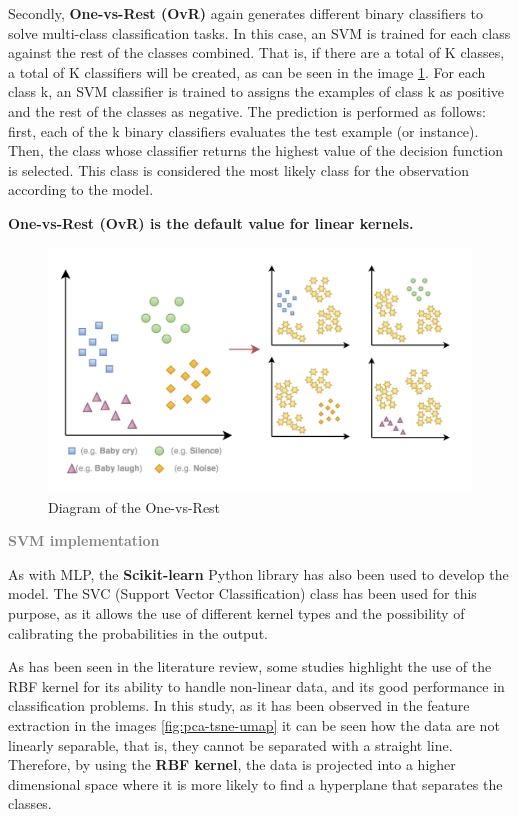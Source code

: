 \vspace{\baselineskip}
Secondly, \textbf{One-vs-Rest (OvR)} again generates different binary classifiers to solve multi-class classification tasks. In this case, an SVM is trained for each class against the rest of the classes combined. That is, if there are a total of K classes, a total of K classifiers will be created, as can be seen in the image \ref{fig:OvR-SVM-model}. For each class k, an SVM classifier is trained to assigns the examples of class k as positive and the rest of the classes as negative. The prediction is performed as follows: first, each of the k binary classifiers evaluates the test example (or instance). Then, the class whose classifier returns the highest value of the decision function is selected. This class is considered the most likely class for the observation according to the model.


\textbf{One-vs-Rest (OvR) is the default value for linear kernels.}

\begin{figure}[h]
\centering
    \includegraphics[width=1\textwidth]{figures/One-vs-Rest.png}
\caption{Diagram of the One-vs-Rest}
\label{fig:OvR-SVM-model}
\end{figure}

\newpage

{\fontsize{16pt}{16pt}\textcolor{gray}{\textbf{SVM implementation}}}

As with MLP, the \textbf{Scikit-learn} Python library has also been used to develop the model. The SVC (Support Vector Classification) class has been used for this purpose, as it allows the use of different kernel types and the possibility of calibrating the probabilities in the output.


As has been seen in the literature review, some studies highlight the use of the RBF kernel for its ability to handle non-linear data, and its good performance in classification problems. In this study, as it has been observed in the feature extraction in the images \ref{fig:pca-tsne-umap} it can be seen how the data are not linearly separable, that is, they cannot be separated with a straight line. Therefore, by using the \textbf{RBF kernel}, the data is projected into a higher dimensional space where it is more likely to find a hyperplane that separates the classes. 

